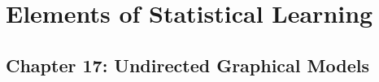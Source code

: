 \documentclass[11pt]{article}
\begin{document}
\newpage
\begin{tcolorbox}
\vspace{4mm}
\bf \LARGE \chapter{Elements of Statistical Learning}
\vspace{4mm}
\end{tcolorbox}

\section*{Chapter 17: Undirected Graphical Models}

\end{document}
